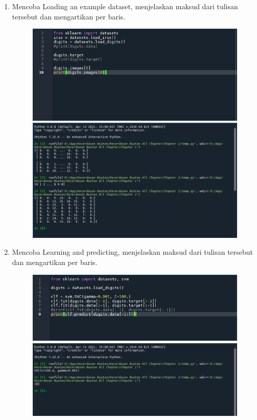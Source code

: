 \begin{enumerate}
\newpage
\item
Mencoba Loading an example dataset, menjelaskan maksud dari tulisan tersebut dan mengartikan per baris.
	\begin{figure}[!htbp]
		\centering
		\includegraphics[scale=0.5]{figures/2.PNG}
		\includegraphics[scale=0.4]{figures/2a.PNG}
	\end{figure}

\newpage
\item
Mencoba Learning and predicting, menjelaskan maksud dari tulisan tersebut dan mengartikan per baris.
	\begin{figure}[!htbp]
		\centering
		\includegraphics[scale=0.5]{figures/3.PNG}
		\includegraphics[scale=0.4]{figures/3a.PNG}
	\end{figure}



\end{enumerate}
